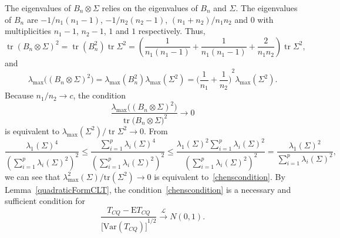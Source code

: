 \documentclass[review]{elsarticle}
\DeclareMathOperator{\mytr}{tr}
\theoremstyle{plain}
\theoremstyle{definition}
\theoremstyle{remark}
\begin{document}
The eigenvalues of $B_n\otimes \Sigma$ relies on the eigenvalues of $B_n$ and $\Sigma$.
    The eigenvalues of $B_n$ are $-1/n_1(n_1-1)$, $-1/n_2(n_2-1)$, $(n_1+n_2)/n_1 n_2$ and $0$ with multiplicities $n_1-1$, $n_2-1$, $1$ and $1$ respectively.
    Thus,
    \begin{equation*}
        \mytr{(B_n\otimes \Sigma)}^2=\mytr(B_n^2)\mytr\Sigma^2=(\frac{1}{n_1(n_1-1)}+\frac{1}{n_1(n_1-1)}+\frac{2}{n_1 n_2})\mytr\Sigma^2,
    \end{equation*}
and
    \begin{equation*}
        \lambda_{\max}\Big({(B_n\otimes \Sigma)}^2\Big)=\lambda_{\max}(B_n^2)\lambda_{\max}(\Sigma^2)={\Big(\frac{1}{n_1}+\frac{1}{n_2}\Big)}^2\lambda_{\max}(\Sigma^2).
    \end{equation*}
    Because $n_1/n_2\to c$, the condition
    $$
         \frac{\lambda_{\max}\Big({(B_n\otimes \Sigma)}^2\Big)}{
\mytr{\big(B_n\otimes \Sigma\big)}^2}
         \to 0
    $$
     is equivalent to $\lambda_{\max}(\Sigma^2)/\mytr\Sigma^2\to 0$.
From
$$
\frac{\lambda_1(\Sigma)^4}{(\sum_{i=1}^p \lambda_i(\Sigma)^2)^2}
\leq
\frac{\sum_{i=1}^p\lambda_i(\Sigma)^4}{(\sum_{i=1}^p \lambda_i(\Sigma)^2)^2}
\leq
\frac{\lambda_1(\Sigma)^2\sum_{i=1}^p\lambda_i(\Sigma)^2}{(\sum_{i=1}^p \lambda_i(\Sigma)^2)^2}
=
\frac{\lambda_1(\Sigma)^2}{\sum_{i=1}^p \lambda_i(\Sigma)^2},
$$
    we can see that ${\lambda_{\max}^2(\Sigma)}/{\mathrm{tr}(\Sigma^2)}\to 0$  is equivalent to~\eqref{chenscondition}.
By Lemma~\ref{quadraticFormCLT}, the condition~\eqref{chenscondition} is a necessary and sufficient condition for 
    \begin{equation*}
        \frac{T_{CQ}-\mathrm{E}T_{CQ}}{{\big[\mathrm{Var}(T_{CQ})\big]}^{1/2}}\xrightarrow{\mathcal{L}}N(0,1).
    \end{equation*}
\end{document}
